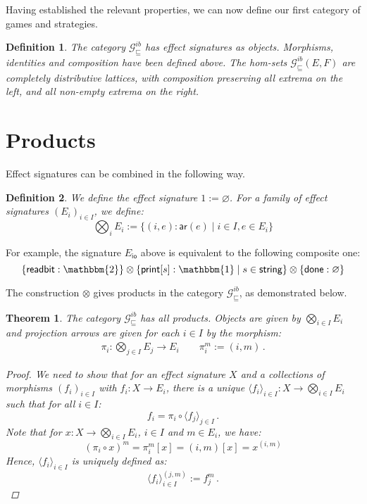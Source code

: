 \documentclass[draft,11pt]{report}
\newtheorem{definition}{Definition}
\newtheorem{theorem}{Theorem}
\newcommand{\gcat}{\mathcal{G}_{\sqsubseteq}}
\newcommand{\kw}[1]{\ensuremath{ \mathsf{#1} }}
\begin{document}
Having established the relevant properties,
we can now define our first category of games and strategies.

\begin{definition}
The category $\gcat^{ib}$ has effect signatures as objects.
Morphisms, identities and composition have been defined above.
The hom-sets $\gcat^{ib}(E, F)$
are completely distributive lattices,
with composition preserving all extrema on the left,
and all non-empty extrema on the right.
\end{definition}


\section{Products} %

Effect signatures can be combined in the following way.

\begin{definition}
We define the effect signature
$1 := \varnothing$.
For a family of effect signatures $(E_i)_{i \in I}$,
we define:
\[
  \bigotimes_i E_i := \{ (i, e) : \kw{ar}(e) \mid i \in I, e \in E_i \}
\]
\end{definition}

For example,
the signature $E_\kw{io}$ above is equivalent
to the following composite one:
\[
    \{ \kw{readbit} : \mathbbm{2} \} \otimes
    \{ \kw{print}[s] : \mathbbm{1} \mid s \in \kw{string} \} \otimes
    \{ \kw{done} : \varnothing \}
\]

The construction $\otimes$ gives products in the category $\gcat^{ib}$,
as demonstrated below.

\begin{theorem}
The category $\gcat^{ib}$ has all products.
Objects are given by $\bigotimes_{i \in I} E_i$
and projection arrows are
given for each $i \in I$ by
the morphism:
\begin{gather*}
    \pi_i : \bigotimes_{j \in I} E_j \rightarrow E_i \qquad
    \pi_i^m := (i, m) \,.
\end{gather*}
\begin{proof}
We need to show that for an effect signature $X$
and a collections of morphisms $(f_i)_{i \in I}$ with
$f_i : X \rightarrow E_i$,
there is a unique
$\langle f_i \rangle_{i \in I} : X \rightarrow \bigotimes_{i \in I} E_i$
such that for all $i \in I$:
\[
    f_i = \pi_i \circ \langle f_j \rangle_{j \in I} \,.
\]
Note that for $x : X \rightarrow \bigotimes_{i \in I} E_i$,
$i \in I$ and $m \in E_i$, we have:
\[
    (\pi_i \circ x)^m = \pi_i^m[x] = (i, m) [x] = x^{(i, m)}
\]
Hence, $\langle f_i \rangle_{i \in I}$ is uniquely defined as:
\[
    \langle f_i \rangle_{i \in I}^{(j, m)} := f_j^m \,.
\]
\end{proof}
\end{theorem}
\end{document}

